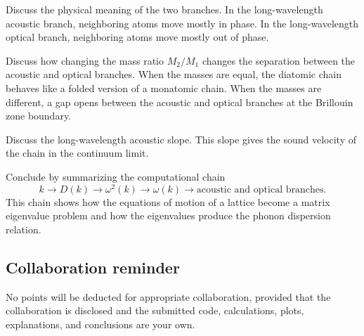 Discuss the physical meaning of the two branches. In the long-wavelength acoustic branch, neighboring atoms move mostly in phase. In the long-wavelength optical branch, neighboring atoms move mostly out of phase.

Discuss how changing the mass ratio \(M_2/M_1\) changes the separation between the acoustic and optical branches. When the masses are equal, the diatomic chain behaves like a folded version of a monatomic chain. When the masses are different, a gap opens between the acoustic and optical branches at the Brillouin zone boundary.

Discuss the long-wavelength acoustic slope. This slope gives the sound velocity of the chain in the continuum limit.

Conclude by summarizing the computational chain
\[
k
\longrightarrow
D(k)
\longrightarrow
\omega^2(k)
\longrightarrow
\omega(k)
\longrightarrow
\text{acoustic and optical branches}.
\]
This chain shows how the equations of motion of a lattice become a matrix eigenvalue problem and how the eigenvalues produce the phonon dispersion relation.

\subsection{Collaboration reminder}

No points will be deducted for appropriate collaboration, provided that the collaboration is disclosed and the submitted code, calculations, plots, explanations, and conclusions are your own.